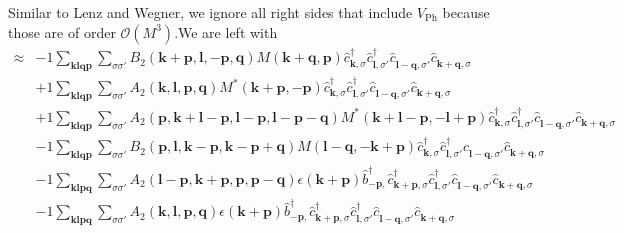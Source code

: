 Similar to Lenz and Wegner, we ignore all right sides that include $V_\mathrm{Ph}$ because those are of order $\mathcal{O}(M^3)$.We are left with
\begin{align*}
	[\eta', H] \approx 	&-1 \sum_{ \mathbf{k} \mathbf{l} \mathbf{q} \mathbf{p} } \sum_{ \sigma \sigma' } B_2( \mathbf{k}+\mathbf{p}, \mathbf{l}, -\mathbf{p}, \mathbf{q} )  M( \mathbf{k}+\mathbf{q}, \mathbf{p} )   \hat{c}_{ \mathbf{k}, \sigma }^\dagger  \hat{c}_{ \mathbf{l}, \sigma' }^\dagger  \hat{c}_{ \mathbf{l}-\mathbf{q}, \sigma' }^{\phantom{\dagger}} \hat{c}_{ \mathbf{k}+\mathbf{q}, \sigma }^{\phantom{\dagger}}  \\
	&+1 \sum_{ \mathbf{k} \mathbf{l} \mathbf{q} \mathbf{p} } \sum_{ \sigma \sigma' } A_2( \mathbf{k}, \mathbf{l}, \mathbf{p}, \mathbf{q} )  M^*( \mathbf{k}+\mathbf{p}, -\mathbf{p} )   \hat{c}_{ \mathbf{k}, \sigma }^\dagger  \hat{c}_{ \mathbf{l}, \sigma' }^\dagger  \hat{c}_{ \mathbf{l}-\mathbf{q}, \sigma' }^{\phantom{\dagger}} \hat{c}_{ \mathbf{k}+\mathbf{q}, \sigma }^{\phantom{\dagger}}  \\
	&+1 \sum_{ \mathbf{k} \mathbf{l} \mathbf{q} \mathbf{p} } \sum_{ \sigma \sigma' } A_2( \mathbf{p}, \mathbf{k}+\mathbf{l}-\mathbf{p}, \mathbf{l}-\mathbf{p}, \mathbf{l}-\mathbf{p}-\mathbf{q} )  M^*( \mathbf{k}+\mathbf{l}-\mathbf{p}, -\mathbf{l}+\mathbf{p} )   \hat{c}_{ \mathbf{k}, \sigma }^\dagger  \hat{c}_{ \mathbf{l}, \sigma' }^\dagger  \hat{c}_{ \mathbf{l}-\mathbf{q}, \sigma' }^{\phantom{\dagger}} \hat{c}_{ \mathbf{k}+\mathbf{q}, \sigma }^{\phantom{\dagger}}  \\
	&-1 \sum_{ \mathbf{k} \mathbf{l} \mathbf{q} \mathbf{p} } \sum_{ \sigma \sigma' } B_2( \mathbf{p}, \mathbf{l}, \mathbf{k}-\mathbf{p}, \mathbf{k}-\mathbf{p}+\mathbf{q} )  M( \mathbf{l}-\mathbf{q}, -\mathbf{k}+\mathbf{p} )   \hat{c}_{ \mathbf{k}, \sigma }^\dagger  \hat{c}_{ \mathbf{l}, \sigma' }^\dagger  \hat{c}_{ \mathbf{l}-\mathbf{q}, \sigma' }^{\phantom{\dagger}} \hat{c}_{ \mathbf{k}+\mathbf{q}, \sigma }^{\phantom{\dagger}}  \\
	&-1 \sum_{ \mathbf{k} \mathbf{l} \mathbf{p} \mathbf{q} } \sum_{ \sigma \sigma' } A_2( \mathbf{l}-\mathbf{p}, \mathbf{k}+\mathbf{p}, \mathbf{p}, \mathbf{p}-\mathbf{q} )  \epsilon( \mathbf{k}+\mathbf{p} )   \hat{b}_{ -\mathbf{p}, }^\dagger  \hat{c}_{ \mathbf{k}+\mathbf{p}, \sigma }^\dagger  \hat{c}_{ \mathbf{l}, \sigma' }^\dagger  \hat{c}_{ \mathbf{l}-\mathbf{q}, \sigma' }^{\phantom{\dagger}} \hat{c}_{ \mathbf{k}+\mathbf{q}, \sigma }^{\phantom{\dagger}}  \\
	&-1 \sum_{ \mathbf{k} \mathbf{l} \mathbf{p} \mathbf{q} } \sum_{ \sigma \sigma' } A_2( \mathbf{k}, \mathbf{l}, \mathbf{p}, \mathbf{q} )  \epsilon( \mathbf{k}+\mathbf{p} )   \hat{b}_{ -\mathbf{p}, }^\dagger  \hat{c}_{ \mathbf{k}+\mathbf{p}, \sigma }^\dagger  \hat{c}_{ \mathbf{l}, \sigma' }^\dagger  \hat{c}_{ \mathbf{l}-\mathbf{q}, \sigma' }^{\phantom{\dagger}} \hat{c}_{ \mathbf{k}+\mathbf{q}, \sigma }^{\phantom{\dagger}}  \\

\end{align*}
